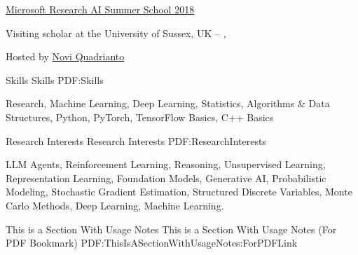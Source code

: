 \documentclass[letterpaper,MMMyyyy,nonstopmode]{simpleresumecv}
\begin{document}
\begin{Body}
\Entry
\href{https://www.microsoft.com/en-us/research/event/ai-summer-school-2018/}{Microsoft Research AI Summer School 2018}
\hfill
{}
\Gap

\Entry
Visiting scholar at the University of Sussex, UK
\hfill
{} --
, 
\begin{Detail}
Hosted by \href{http://www.sussex.ac.uk/profiles/335583}{Novi Quadrianto} \hfil
\end{Detail}


\Section
{Skills}
{Skills}
{PDF:Skills}

\Entry Research, Machine Learning, Deep Learning, Statistics, Algorithms \& Data Structures, Python, PyTorch, TensorFlow Basics, C++ Basics



\Section
{Research Interests}
{Research Interests}
{PDF:ResearchInterests}

\Entry LLM Agents, Reinforcement Learning, Reasoning, Unsupervised Learning, Representation Learning, Foundation Models, Generative AI, Probabilistic Modeling, Stochastic Gradient Estimation, Structured Discrete Variables, Monte Carlo Methods, Deep Learning, Machine Learning.


\iffalse

\Section
{Languages}
{Languages}
{PDF:Languages}

\BulletItem
Russian: Mother tongue.

\Gap
\BulletItem
English: Fluent


\Section
{Skills}
{Skills}
{PDF:Skills}

\BulletItem
Machine Learning, Deep Learning, Probabilistic Machine Learning

\BulletItem
Python, Pytorch, Feel free with Linux
\fi

\iffalse

\begingroup
\color{red}

\Section
{This is a\newline
Section\newline
With\newline
Usage Notes}
{This is a Section With Usage Notes (For PDF Bookmark)}
{PDF:ThisIsASectionWithUsageNotes:ForPDFLink}


\end{Body}
\end{document}
